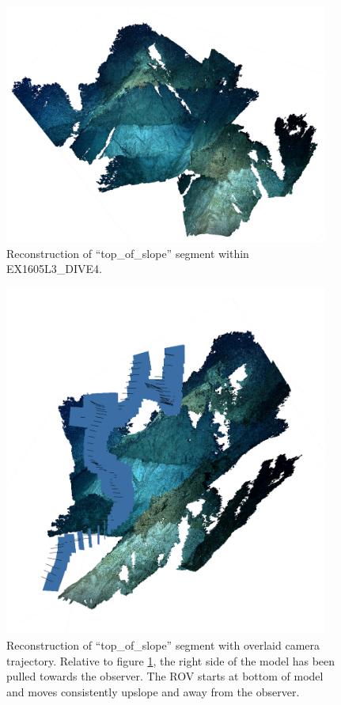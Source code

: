\documentclass[letterpaper,12pt]{article}
\begin{document}
\begin{figure}
    \centering
    \includegraphics[width=0.95\textwidth]{images/top_of_slope_reconstruction.png}
    \caption{Reconstruction of ``top\_of\_slope'' segment within EX1605L3\_DIVE4.}
    \label{fig:top_of_slope_photoscan}
\end{figure}

\begin{figure}
    \centering
    \includegraphics[width=0.95\textwidth]{images/top_of_slope_reconstruction_trajectory.png}
    \caption{Reconstruction of ``top\_of\_slope'' segment with overlaid camera trajectory.  Relative to figure \ref{fig:top_of_slope_photoscan}, the right side of the model has been pulled towards the observer.  The ROV starts at bottom of model and moves consistently upslope and away from the observer.}
    \label{fig:top_of_slope_photoscan_trajectory}
\end{figure}
\end{document}
